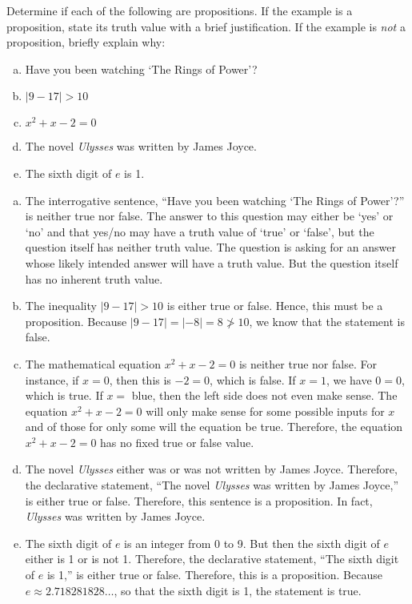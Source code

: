 \documentclass[11pt,letterpaper]{article}
\begin{document}

 Determine if each of the following are propositions. If the example is a proposition, state its truth value with a brief justification. If the example is \textit{not} a proposition, briefly explain why:
	\begin{enumerate}[(a)]
	\item Have you been watching `The Rings of Power'?
	\item $|9 - 17| > 10$
	\item $x^2 + x - 2= 0$
	\item The novel \textit{Ulysses} was written by James Joyce. 
	\item The sixth digit of $e$ is 1.
	\end{enumerate} \pspace

\sol
\begin{enumerate}[(a)]
\item The interrogative sentence, ``Have you been watching `The Rings of Power'?'' is neither true nor false. The answer to this question may either be `yes' or `no' and that yes/no may have a truth value of `true' or `false', but the question itself has neither truth value. The question is asking for an answer whose likely intended answer will have a truth value. But the question itself has no inherent truth value. \pspace

\item The inequality $|9 - 17| > 10$ is either true or false. Hence, this must be a proposition. Because $|9 - 17|= |-8|= 8 \not> 10$, we know that the statement is false. \pspace

\item The mathematical equation $x^2 + x - 2= 0$ is neither true nor false. For instance, if $x= 0$, then this is $-2 = 0$, which is false. If $x= 1$, we have $0= 0$, which is true. If $x=$ blue, then the left side does not even make sense. The equation  $x^2 + x - 2= 0$ will only make sense for some possible inputs for $x$ and of those for only some will the equation be true. Therefore, the equation $x^2 + x - 2= 0$ has no fixed true or false value. \pspace

\item The novel \textit{Ulysses} either was or was not written by James Joyce. Therefore, the declarative statement, ``The novel \textit{Ulysses} was written by James Joyce,'' is either true or false. Therefore, this sentence is a proposition. In fact, \textit{Ulysses} was written by James Joyce. \pspace

\item The sixth digit of $e$ is an integer from 0 to 9. But then the sixth digit of $e$ either is 1 or is not 1. Therefore, the declarative statement, ``The sixth digit of $e$ is 1,'' is either true or false. Therefore, this is a proposition. Because $e \approx 2.718281828\ldots$, so that the sixth digit is 1, the statement is true. 
\end{enumerate}
\end{document}
